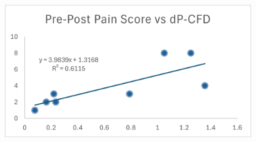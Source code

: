 \documentclass{beamer}
\begin{document}
\begin{frame}
\begin{columns}
\begin{column}{0.4\textwidth}
\begin{table}[h!]
                \tiny
                \label{tab:comparison_transposed}
                \end{table}

                \vspace{-0.05\textwidth}



                
        \end{column}

        \begin{column}{0.5\textwidth}

            \begin{figure}[H]
                \centering
                \includegraphics[width=\textwidth]{figures/Result_Painscore.jpg}
            \end{figure}
        \end{column}


\end{columns}
\end{frame}
\end{document}
